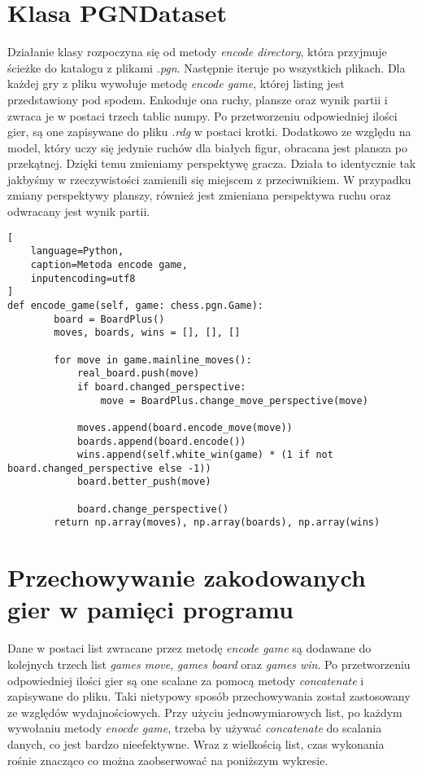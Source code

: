 \section*{Klasa PGNDataset}
Działanie klasy rozpoczyna się od metody \textit{encode directory}, która przyjmuje ścieżke do katalogu z plikami \textit{.pgn}. Następnie iteruje po wszystkich plikach. Dla każdej gry z pliku wywołuje metodę \textit{encode game}, której listing jest przedstawiony pod spodem. Enkoduje ona ruchy, plansze oraz wynik partii i zwraca je w postaci trzech tablic numpy. Po przetworzeniu odpowiedniej ilości gier, są one zapisywane do pliku \textit{.rdg} w postaci krotki. Dodatkowo ze względu na model, który uczy się jedynie ruchów dla białych figur, obracana jest plansza po przekątnej. Dzięki temu zmieniamy perspektywę gracza. Działa to identycznie tak jakbyśmy w rzeczywistości zamienili się miejscem z przeciwnikiem. W przypadku zmiany perspektywy planszy, również jest zmieniana perspektywa ruchu oraz odwracany jest wynik partii. 

\lstset{style=codeListingStyle}
\begin{lstlisting}[
    language=Python, 
    caption=Metoda encode game,
    inputencoding=utf8
]
def encode_game(self, game: chess.pgn.Game):
        board = BoardPlus()
        moves, boards, wins = [], [], []

        for move in game.mainline_moves():
            real_board.push(move)
            if board.changed_perspective:
                move = BoardPlus.change_move_perspective(move)

            moves.append(board.encode_move(move))
            boards.append(board.encode())
            wins.append(self.white_win(game) * (1 if not board.changed_perspective else -1))
            board.better_push(move)

            board.change_perspective()
        return np.array(moves), np.array(boards), np.array(wins)
\end{lstlisting}

\section*{Przechowywanie zakodowanych gier w pamięci programu}
Dane w postaci list zwracane przez metodę \textit{encode game} są dodawane do kolejnych trzech list \textit{games move}, \textit{games board} oraz \textit{games win}. Po przetworzeniu odpowiedniej ilości gier są one scalane za pomocą metody \textit{concatenate} i zapisywane do pliku. Taki nietypowy sposób przechowywania został zastosowany ze względów wydajnościowych. Przy użyciu jednowymiarowych list, po każdym wywołaniu metody \textit{enocde game}, trzeba by używać \textit{concatenate} do scalania danych, co jest bardzo nieefektywne. Wraz z wielkością list, czas wykonania rośnie znacząco co można zaobserwować na poniższym wykresie.

